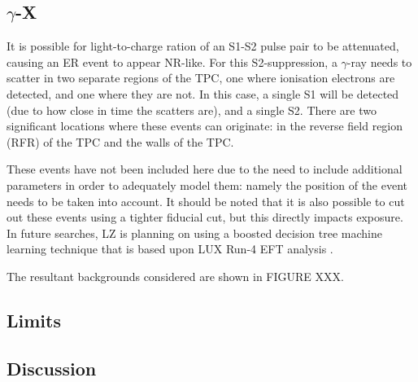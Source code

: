 \subsection{$\gamma$-X}
It is possible for light-to-charge ration of an S1-S2 pulse pair to be attenuated, causing an ER event to appear NR-like.
For this S2-suppression, a $\gamma$-ray needs to scatter in two separate regions of the TPC, one where ionisation electrons are detected, and one where they are not.
In this case, a single S1 will be detected (due to how close in time the scatters are), and a single S2.
There are two significant locations where these events can originate: in the reverse field region (RFR) of the TPC and the walls of the TPC.
\par
These events have not been included here due to the need to include additional parameters in order to adequately model them: namely the position of the event needs to be taken into account.
It should be noted that it is also possible to cut out these events using a tighter fiducial cut, but this directly impacts exposure.
In future searches, LZ is planning on using a boosted decision tree machine learning technique that is based upon LUX Run-4 EFT analysis \cite{LUX_RUN4_EFT_2021}.

\par
The resultant backgrounds considered are shown in FIGURE XXX.



\subsection{Limits}
\par



\subsection{Discussion}
